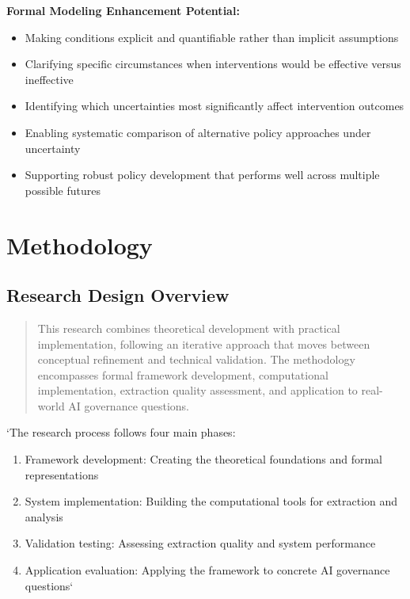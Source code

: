 \documentclass[
  11pt,
  letterpaper,
]{book}
\providecommand{\tightlist}{%
  \setlength{\itemsep}{0pt}\setlength{\parskip}{0pt}}
\begin{document}
\textbf{Formal Modeling Enhancement Potential:}

\begin{itemize}
\tightlist
\item
  Making conditions explicit and quantifiable rather than implicit
  assumptions
\item
  Clarifying specific circumstances when interventions would be
  effective versus ineffective
\item
  Identifying which uncertainties most significantly affect intervention
  outcomes
\item
  Enabling systematic comparison of alternative policy approaches under
  uncertainty
\item
  Supporting robust policy development that performs well across
  multiple possible futures
\end{itemize}

\section{Methodology}\label{sec-methodology}

\subsection{Research Design Overview}\label{sec-research-design}

\begin{quote}
This research combines theoretical development with practical
implementation, following an iterative approach that moves between
conceptual refinement and technical validation. The methodology
encompasses formal framework development, computational implementation,
extraction quality assessment, and application to real-world AI
governance questions.
\end{quote}

`The research process follows four main phases:

\begin{enumerate}
\def\labelenumi{\arabic{enumi}.}
\tightlist
\item
  Framework development: Creating the theoretical foundations and formal
  representations
\item
  System implementation: Building the computational tools for extraction
  and analysis
\item
  Validation testing: Assessing extraction quality and system
  performance
\item
  Application evaluation: Applying the framework to concrete AI
  governance questions`
\end{enumerate}
\end{document}

